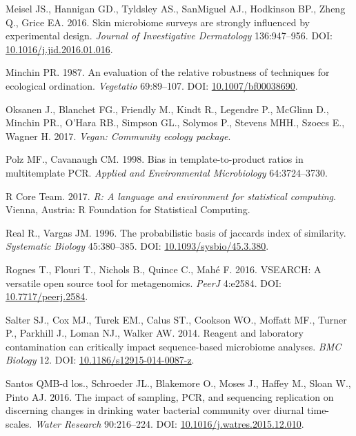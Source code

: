 \documentclass[11pt,]{article}
\begin{document}
\hypertarget{ref-Meisel2016}{}
Meisel JS., Hannigan GD., Tyldsley AS., SanMiguel AJ., Hodkinson BP.,
Zheng Q., Grice EA. 2016. Skin microbiome surveys are strongly
influenced by experimental design. \emph{Journal of Investigative
Dermatology} 136:947--956. DOI:
\href{https://doi.org/10.1016/j.jid.2016.01.016}{10.1016/j.jid.2016.01.016}.

\hypertarget{ref-bc_index_Minchin1987}{}
Minchin PR. 1987. An evaluation of the relative robustness of techniques
for ecological ordination. \emph{Vegetatio} 69:89--107. DOI:
\href{https://doi.org/10.1007/bf00038690}{10.1007/bf00038690}.

\hypertarget{ref-vegan_citation}{}
Oksanen J., Blanchet FG., Friendly M., Kindt R., Legendre P., McGlinn
D., Minchin PR., O'Hara RB., Simpson GL., Solymos P., Stevens MHH.,
Szoecs E., Wagner H. 2017. \emph{Vegan: Community ecology package}.

\hypertarget{ref-polz_bias_1998}{}
Polz MF., Cavanaugh CM. 1998. Bias in template-to-product ratios in
multitemplate PCR. \emph{Applied and Environmental Microbiology}
64:3724--3730.

\hypertarget{ref-r_citation_2017}{}
R Core Team. 2017. \emph{R: A language and environment for statistical
computing}. Vienna, Austria: R Foundation for Statistical Computing.

\hypertarget{ref-Real1996}{}
Real R., Vargas JM. 1996. The probabilistic basis of jaccards index of
similarity. \emph{Systematic Biology} 45:380--385. DOI:
\href{https://doi.org/10.1093/sysbio/45.3.380}{10.1093/sysbio/45.3.380}.

\hypertarget{ref-vsearch_Rognes_2016}{}
Rognes T., Flouri T., Nichols B., Quince C., Mahé F. 2016. VSEARCH: A
versatile open source tool for metagenomics. \emph{PeerJ} 4:e2584. DOI:
\href{https://doi.org/10.7717/peerj.2584}{10.7717/peerj.2584}.

\hypertarget{ref-contamination_Salter2014}{}
Salter SJ., Cox MJ., Turek EM., Calus ST., Cookson WO., Moffatt MF.,
Turner P., Parkhill J., Loman NJ., Walker AW. 2014. Reagent and
laboratory contamination can critically impact sequence-based microbiome
analyses. \emph{BMC Biology} 12. DOI:
\href{https://doi.org/10.1186/s12915-014-0087-z}{10.1186/s12915-014-0087-z}.

\hypertarget{ref-BautistadelosSantos2016}{}
Santos QMB-d los., Schroeder JL., Blakemore O., Moses J., Haffey M.,
Sloan W., Pinto AJ. 2016. The impact of sampling, PCR, and sequencing
replication on discerning changes in drinking water bacterial community
over diurnal time-scales. \emph{Water Research} 90:216--224. DOI:
\href{https://doi.org/10.1016/j.watres.2015.12.010}{10.1016/j.watres.2015.12.010}.
\end{document}
